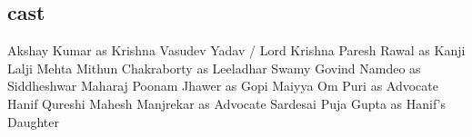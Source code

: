 \documentclass[a4paper]{article}
\begin{document}
	        \subsection{cast}
	        
	        Akshay Kumar as Krishna Vasudev Yadav / Lord Krishna
Paresh Rawal as Kanji Lalji Mehta
Mithun Chakraborty as Leeladhar Swamy
Govind Namdeo as Siddheshwar Maharaj
Poonam Jhawer as Gopi Maiyya
Om Puri as Advocate Hanif Qureshi
Mahesh Manjrekar as Advocate Sardesai
Puja Gupta as Hanif's Daughter
	     
	    
\end{document}
